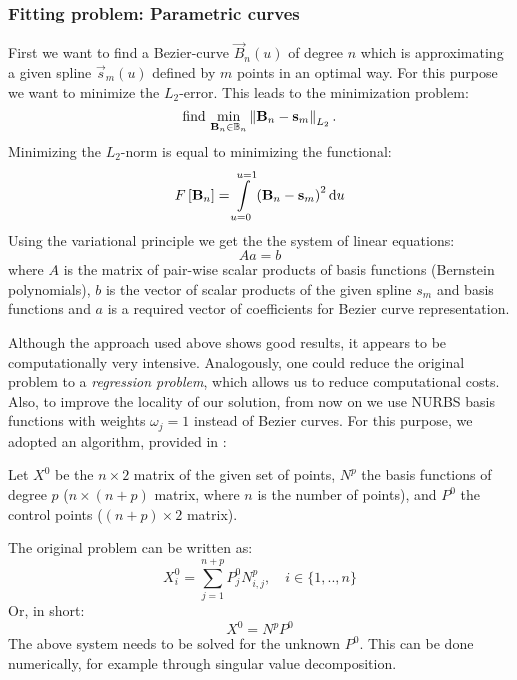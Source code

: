 \subsubsection{Fitting problem: Parametric curves}
First we want to find a Bezier-curve $\vec{B}_n\left(u\right)$ of degree $n$ which is approximating a given spline $\vec{s}_m\left(u\right)$ defined by $m$ points in an optimal way. For this purpose we want to minimize the $L_2$-error. This leads to the minimization problem:
\begin{equation}
\text{find\ } \underset{\vec{B}_n\in \mathbb{B}_n}{\min} \Ltwonorm{\vec{B}_n-\vec{s}_m}.
\end{equation}
Minimizing the $L_2$-norm is equal to minimizing the functional:
\begin{equation}
F\left[\vec{B}_n\right]=\int\limits_{u=0}^{u=1} \left(\vec{B}_n-\vec{s}_m\right)^2\du
\end{equation}
Using the variational principle we get the the system of linear equations:
\begin{equation}
A a = b
\end{equation}
where $A$ is the matrix of pair-wise scalar products of basis functions (Bernstein polynomials), $b$ is the vector of scalar products of the given spline $s_{m}$ and basis functions and $a$ is a required vector of coefficients for Bezier curve representation.

Although the approach used above shows good results, it appears to be computationally very intensive. Analogously, one could reduce the original problem to a \emph{regression problem}, which allows us to reduce computational costs. Also, to improve the locality of our solution, from now on we use NURBS basis functions with weights $\omega_{j} = 1$ instead of Bezier curves. For this purpose, we adopted an algorithm, provided in \cite{becker2011advanced}:

Let $X^{0}$ be the $n \times 2$ matrix of the given set of points, $N^{p}$ the basis functions of degree $p$ ($n \times (n+p)$ matrix, where $n$ is the number of points), and $P^{0}$ the control points ($(n+p) \times 2$ matrix).

The original problem can be written as:
\begin{equation}
X_{i}^{0} = \sum\limits_{j=1}^{n+p} P_{j}^{0} N_{i,j}^{p}, \quad i \in \{1,..,n\}
\end{equation}
Or, in short:
\begin{equation}
X^{0} = N^{p} P^{0}
\end{equation}
The above system needs to be solved for the unknown $P^{0}$. This can be done numerically, for example through singular value decomposition. 

